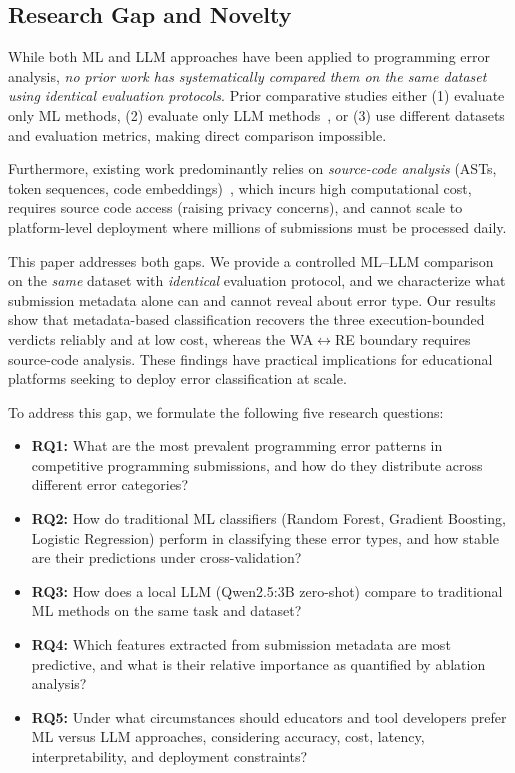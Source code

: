 \documentclass[acmsmall]{acmart}
\begin{document}
\subsection*{Research Gap and Novelty}

While both ML and LLM approaches have been applied to programming error
analysis, \textit{no prior work has systematically compared them on the same
dataset using identical evaluation protocols}. Prior comparative studies either
(1) evaluate only ML methods,
(2) evaluate only LLM methods~\cite{raihan2025large,zamfirescu2023what},
or (3) use different datasets and evaluation metrics, making direct comparison
impossible.

Furthermore, existing work predominantly relies on \textit{source-code
analysis} (ASTs, token sequences, code
embeddings)~\cite{wang2017learning,feng2020codebert}, which incurs high
computational cost, requires source code access (raising privacy concerns),
and cannot scale to platform-level deployment where millions of submissions
must be processed daily.

This paper addresses both gaps. We provide a controlled ML--LLM comparison
on the \emph{same} dataset with \emph{identical} evaluation protocol, and we
characterize what submission metadata alone can and cannot reveal about error
type. Our results show that metadata-based classification recovers the three
execution-bounded verdicts reliably and at low cost, whereas the
WA$\leftrightarrow$RE boundary requires source-code analysis. These findings
have practical implications for educational platforms seeking to deploy error
classification at scale.

To address this gap, we formulate the following five research questions:

\begin{itemize}
    \item \textbf{RQ1:} What are the most prevalent programming error patterns
          in competitive programming submissions, and how do they distribute
          across different error categories?
    \item \textbf{RQ2:} How do traditional ML classifiers (Random Forest,
          Gradient Boosting, Logistic Regression) perform in classifying these
          error types, and how stable are their predictions under cross-validation?
    \item \textbf{RQ3:} How does a local LLM (Qwen2.5:3B zero-shot) compare to traditional ML methods on the same task
          and dataset?
    \item \textbf{RQ4:} Which features extracted from submission metadata are
          most predictive, and what is their relative importance as quantified
          by ablation analysis?
    \item \textbf{RQ5:} Under what circumstances should educators and tool
          developers prefer ML versus LLM approaches, considering accuracy,
          cost, latency, interpretability, and deployment constraints?
\end{itemize}
\end{document}
